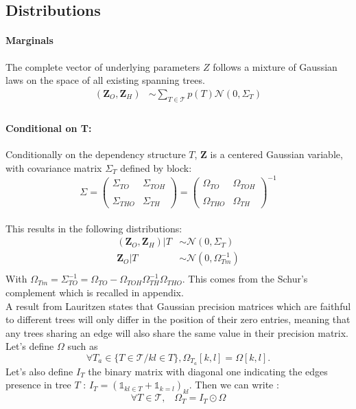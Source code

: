 \documentclass[11pt,a4paper]{article}
\newcommand{\Zbf}{\boldsymbol{Z}}
\begin{document}
\subsection{Distributions}
\label{distrib}
\paragraph{Marginals}
The complete vector of underlying parameters $Z$ follows a mixture of Gaussian laws on the space of all existing spanning trees.
\begin{align*}
(\Zbf_O,\Zbf_H) &\sim \sum_{T \in \mathcal{T}} p(T) \mathcal{N}(0,\Sigma_T) \\
\end{align*}

\paragraph{Conditional on T:}
Conditionally on the dependency structure $T$, $\Zbf$ is a centered Gaussian variable, with covariance matrix $\Sigma_T$ defined by block:
\[
 \Sigma=
  \left( {\begin{array}{cc}
  \Sigma_{TO} &  \Sigma_{TOH}\\\\
  \Sigma_{THO} & \Sigma_{TH}
  \end{array} } \right) =
   \left( {\begin{array}{cc}
  \Omega_{TO} &  \Omega_{TOH}\\\\
  \Omega_{THO} & \Omega_{TH}
  \end{array} } \right)^{-1}
  \]\\
This results in the following distributions:
\begin{align*}
(\Zbf_O,\Zbf_H)|T & \sim\mathcal{N}(0,\Sigma_T)\\
\Zbf_O|T & \sim\mathcal{N}(0,\Omega_{Tm}^{-1})\\
\end{align*}
With $ \Omega_{Tm} =\Sigma_{TO}^{-1} =  \Omega_{TO} - \Omega_{TOH}\Omega_{TH}^{-1}\Omega_{THO}$. This comes from the Schur's complement which is recalled in appendix.\\

A result from Lauritzen states that Gaussian precision matrices which are faithful to different trees will only differ in the position of their zero entries, meaning that any trees sharing  an edge will also share the same value in their precision matrix. Let's define $\Omega$ such as $$\forall T_a \in \{T \in\mathcal{T} / kl \in T \}, \Omega_{T_a}[k,l] =  \Omega [k,l].$$ Let's also define $I_T$ the binary matrix with diagonal one indicating the  edges presence in tree $T$ : $I_T=(\mathds{1}_{kl \in T} + \mathds{1}_{k=l})_{kl}$. Then we can write :
$$\forall T\in \mathcal{T}, \;\;\; \Omega_T = I_T \odot \Omega $$
\end{document}
